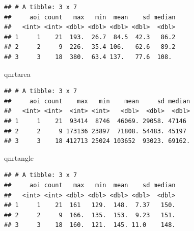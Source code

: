 \documentclass[
]{article}
\newenvironment{Shaded}{\begin{snugshade}}{\end{snugshade}}
\newcommand{\NormalTok}[1]{#1}
\begin{document}
\begin{verbatim}
## # A tibble: 3 x 7
##     aoi count   max   min  mean    sd median
##   <int> <int> <dbl> <dbl> <dbl> <dbl>  <dbl>
## 1     1    21  193.  26.7  84.5  42.3   86.2
## 2     2     9  226.  35.4 106.   62.6   89.2
## 3     3    18  380.  63.4 137.   77.6  108.
\end{verbatim}

\begin{Shaded}
\begin{Highlighting}[]
\NormalTok{qnrtarea}
\end{Highlighting}
\end{Shaded}

\begin{verbatim}
## # A tibble: 3 x 7
##     aoi count    max   min    mean     sd median
##   <int> <int>  <int> <int>   <dbl>  <dbl>  <dbl>
## 1     1    21  93414  8746  46069. 29058. 47146 
## 2     2     9 173136 23897  71808. 54483. 45197 
## 3     3    18 412713 25024 103652  93023. 69162.
\end{verbatim}

\begin{Shaded}
\begin{Highlighting}[]
\NormalTok{qnrtangle}
\end{Highlighting}
\end{Shaded}

\begin{verbatim}
## # A tibble: 3 x 7
##     aoi count   max   min  mean    sd median
##   <int> <int> <dbl> <dbl> <dbl> <dbl>  <dbl>
## 1     1    21  161   129.  148.  7.37   150.
## 2     2     9  166.  135.  153.  9.23   151.
## 3     3    18  160.  121.  145. 11.0    148.
\end{verbatim}
\end{document}
